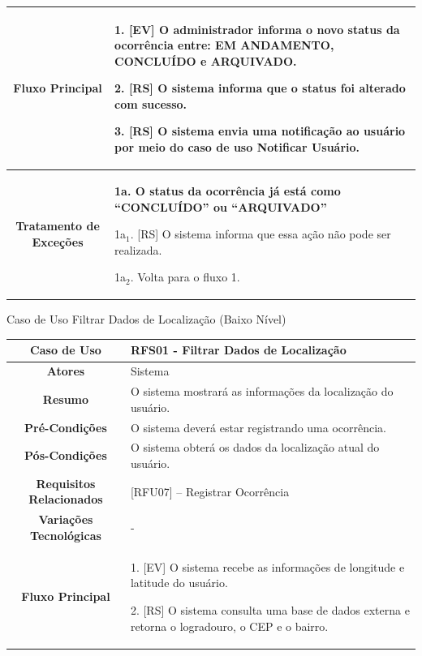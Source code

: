 \begin{apendicesenv}
\begin{quadro}[htb]
\begin{tabular}{|c|p{11cm}|}
		\textbf{Fluxo Principal} &
		\parbox[t]{11cm}{
			\raggedright
			1. [EV] O administrador informa o novo status da ocorrência entre: EM ANDAMENTO, CONCLUÍDO e ARQUIVADO.\par
			2. [RS] O sistema informa que o status foi alterado com sucesso.\par
			3. [RS] O sistema envia uma notificação ao usuário por meio do caso de uso \textbf{Notificar Usuário}.
		}
		\\ \hline
		
		\textbf{Tratamento de Exceções} &
		\parbox[t]{11cm}{
			\raggedright
			\textbf{1a. O status da ocorrência já está como ``CONCLUÍDO'' ou ``ARQUIVADO''}\par
			1a$_1$. [RS] O sistema informa que essa ação não pode ser realizada.\par
			1a$_2$. Volta para o fluxo 1.
		}
		\\ \hline
	\end{tabular}
	
\end{quadro}

\begin{quadro}[htb]
	\centering
	\caption{\label{quadro_rfs01}Caso de Uso Filtrar Dados de Localização (Baixo Nível)}
	\small
	\renewcommand{\arraystretch}{1.1}
	
	\begin{tabular}{|c|p{11cm}|}
		\hline
		\textbf{Caso de Uso} & RFS01 - Filtrar Dados de Localização \\ \hline
		\textbf{Atores} & Sistema \\ \hline
		\textbf{Resumo} & O sistema mostrará as informações da localização do usuário. \\ \hline
		\textbf{Pré-Condições} & O sistema deverá estar registrando uma ocorrência. \\ \hline
		\textbf{Pós-Condições} & O sistema obterá os dados da localização atual do usuário. \\ \hline
		\textbf{Requisitos Relacionados} & [RFU07] -- Registrar Ocorrência \\ \hline
		\textbf{Variações Tecnológicas} & - \\ \hline
		
		\textbf{Fluxo Principal} &
		\parbox[t]{11cm}{
			\raggedright
			1. [EV] O sistema recebe as informações de longitude e latitude do usuário.\par
			2. [RS] O sistema consulta uma base de dados externa e retorna o logradouro, o CEP e o bairro.
		}
		\\ \hline
		

\end{tabular}
\end{quadro}
\end{apendicesenv}
